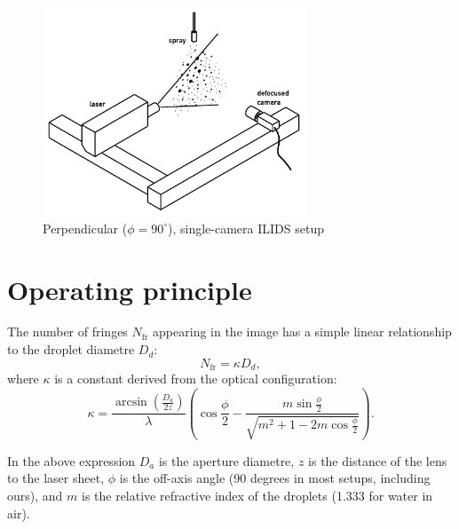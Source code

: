 \documentclass[11.5pt,oneside]{book}
\begin{document}
\begin{figure}
\centering
\includegraphics[width=0.7\textwidth]{img/setup/ipi_setup_simple.pdf}
\caption{Perpendicular ($\phi=90^\circ$), single-camera ILIDS setup
\label{fig:ipi-setup-simple}}
\end{figure}
\section{Operating principle}
The number of fringes $N_\text{fr}$ appearing in the image has a simple linear relationship to
the droplet diametre $D_d$:
\begin{equation}
    N_\text{fr} = \kappa D_d,
\end{equation}
where $\kappa$ is a constant derived from the optical configuration:
\begin{equation}
    \kappa = \frac{\arcsin\left(\frac{D_a}{2z}\right)}{\lambda}
    \left(\cos\frac{\phi}{2} - \frac{m \sin\frac{\phi}{2}}{\sqrt{m^2 + 1 -
    2m\cos \frac{\phi}{2}}}\right).
    \label{kappa}
\end{equation}

In the above expression $D_a$ is the aperture diametre, $z$ is the distance of
the lens to the laser sheet, $\phi$ is the off-axis angle (90 degrees in most
setups, including ours), and $m$ is the relative refractive index of the
droplets (1.333 for water in air).
\end{document}

